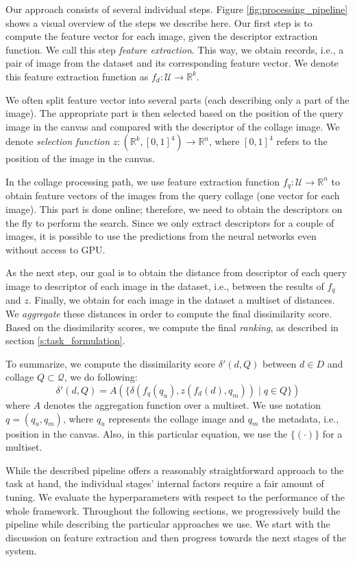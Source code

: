 Our approach consists of several individual steps. Figure \ref{fig:processing_pipeline} shows a visual overview of the steps we describe here. Our first step is to compute the feature vector for each image, given the descriptor extraction function. We call this step \emph{feature extraction}. This way, we obtain records, i.e., a pair of image from the dataset and its corresponding feature vector. We denote this feature extraction function as $f_d:\mathcal{U} \rightarrow \mathbb{R}^k$.

We often split feature vector into several parts (each describing only a part of the image). The appropriate part is then selected based on the position of the query image in the canvas and compared with the descriptor of the collage image. We denote \emph{selection function} $z: (\mathbb{R}^k, [0,1]^4) \rightarrow \mathbb{R}^n$, where $[0,1]^4$ refers to the position of the image in the canvas.

In the collage processing path, we use feature extraction function $f_q: \mathcal{U} \rightarrow \mathbb{R}^n$ to obtain feature vectors of the images from the query collage (one vector for each image). This part is done online; therefore, we need to obtain the descriptors on the fly to perform the search. Since we only extract descriptors for a couple of images, it is possible to use the predictions from the neural networks even without access to GPU.

As the next step, our goal is to obtain the distance from descriptor of each query image to descriptor of each image in the dataset, i.e., between the results of $f_q$ and $z$. Finally, we obtain for each image in the dataset a multiset of distances. We \emph{aggregate} these distances in order to compute the final dissimilarity score. Based on the dissimilarity scores, we compute the final \emph{ranking}, as described in section \ref{s:task_formulation}.

To summarize, we compute the dissimilarity score $\delta'(d, Q)$ between $d \in D$ and collage $Q \subset \mathcal{Q}$, we do following:
$$
   \delta'(d, Q) = A(\{\delta(f_q(q_u), z(f_d(d), q_m)) \mid q\in Q\})
$$
where $A$ denotes the aggregation function over a multiset. We use notation $q = (q_u, q_m)$, where $q_u$ represents the collage image and $q_m$ the metadata, i.e., position in the canvas. Also, in this particular equation, we use the $\{(\cdot)\}$ for a multiset.

While the described pipeline offers a reasonably straightforward approach to the task at hand, the individual stages' internal factors require a fair amount of tuning. We evaluate the hyperparameters with respect to the performance of the whole framework. Throughout the following sections, we progressively build the pipeline while describing the particular approaches we use. We start with the discussion on feature extraction and then progress towards the next stages of the system.  

